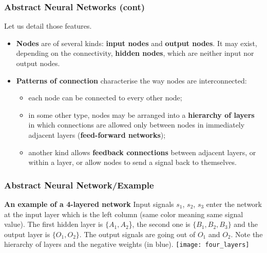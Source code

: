 %
\begin{frame}
\frametitle{Abstract Neural Networks (cont)}

Let us detail those features.
\begin{itemize}

  \item \textbf{Nodes} are of several kinds: \textbf{input nodes} and
  \textbf{output nodes}. It may exist, depending on the connectivity,
  \textbf{hidden nodes}, which are neither input nor output nodes.

  \item \textbf{Patterns of connection} characterise the way nodes are
  interconnected:

  \begin{itemize}

    \item each node can be connected to every other node; 

    \item in some other type, nodes may be arranged into a
    \textbf{hierarchy of layers} in which connections are allowed only
    between nodes in immediately adjacent layers (\textbf{feed-forward
    networks});

    \item another kind allows \textbf{feedback connections} between
    adjacent layers, or within a layer, or allow nodes to send a
    signal back to themselves.
  
  \end{itemize}

\end{itemize}

\end{frame}

%
\begin{frame}
\frametitle{Abstract Neural Network/Example}

\textbf{An example of a 4-layered network} Input signals $s_1$, $s_2$,
$s_3$ enter the network at the input layer which is the left column
(same color meaning same signal value). The first hidden layer is
$\{A_1, A_2$\}, the second one is $\{B_1, B_2, B_3\}$ and the output
layer is $\{O_1, O_2\}$. The output signals are going out of $O_1$ and
$O_2$. Note the hierarchy of layers and the negative weights (in
blue).
\vfill
\centering\texttt{[image: four\_layers]}

\end{frame}

